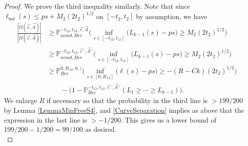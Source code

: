 \begin{proof}
	We prove the third inequality similarly. Note that since $\ell_{bot}(s) \leq ps + M_2(2t_2)^{1/2}$ on $[-t_2,t_2]$ by assumption, we have
	\begin{align*}
	\frac{|\tilde{\Omega}(\vec{c},\vec{d})|}{|\Omega(\vec{c},\vec{d})|} &\geq \mathbb{P}^{-t_{12}, t_{12}, \vec{c},\vec{d}}_{avoid, Ber}\Big(\inf_{s\in[-t_{12}, t_{12}]} \big(L_{k-1}(s) - ps\big) \geq M_2(2t_2)^{1/2}\Big)\\
	&\geq \mathbb{P}^{-t_{12}, t_{12}, \vec{c}\,',\vec{d}\,'}_{avoid, Ber}\Big(\inf_{s\in[-t_{12}, t_{12}]} \big(L_{k-1}(s) - ps\big) \geq M_2(2t_2)^{1/2}\Big)\\
	&\geq \mathbb{P}^{0, 2t_{12}, 0, z}_{Ber}\Big(\inf_{s\in[0, 2t_{12}]} \big(\ell(s) - ps\big) \geq -(R-Ck)(2t_2)^{1/2}\Big)\\
	&\qquad - \big(1 - \mathbb{P}^{-t_{12},t_{12},\vec{c}\,',\vec{d}\,'}_{Ber}(L_1\geq \cdots \geq L_{k-1})\big).
	\end{align*}
	We enlarge $R$ if necessary so that the probability in the third line is $>199/200$ by Lemma \ref{LemmaMinFreeS4}, and \ref{CurveSeparation} implies as above that the expression in the last line is $>-1/200$. This gives us a lower bound of $199/200 - 1/200 = 99/100$ as desired.\\
	

\end{proof}
